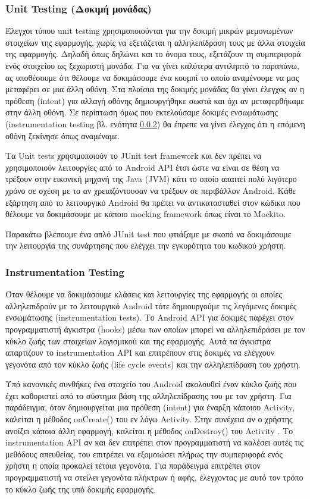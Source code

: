 		\subsubsection{Unit Testing (Δοκιμή μονάδας)}
		Έλεγχοι τύπου unit testing χρησιμοποιούνται για την δοκιμή μικρών μεμονωμένων στοιχείων της εφαρμογής, χωρίς να εξετάζεται η αλληλεπίδραση τους με άλλα στοιχεία της εφαρμογής. Δηλαδή όπως δηλώνει και το όνομα τους, εξετάζουν τη συμπεριφορά ενός στοιχείου ως ξεχωριστή μονάδα. Για να γίνει καλύτερα αντιληπτό το παραπάνω, ας υποθέσουμε ότι θέλουμε να δοκιμάσουμε ένα κουμπί το οποίο αναμένουμε να μας μεταφέρει σε μια άλλη οθόνη.  Στα πλαίσια της δοκιμής μονάδας θα γίνει έλεγχος αν η πρόθεση (intent) για αλλαγή οθόνης δημιουργήθηκε σωστά και όχι αν μεταφερθήκαμε στην άλλη οθόνη. Σε περίπτωση όμως που εκτελούσαμε δοκιμές ενσωμάτωσης (instrumentation testing βλ. ενότητα \ref{sssec:instrumentation_testing}) θα έπρεπε να γίνει έλεγχος ότι η επόμενη οθόνη ξεκίνησε όπως αναμέναμε.
		
		Τα Unit tests χρησιμοποιούν το JUnit test framework και δεν πρέπει να χρησιμοποιούν λειτουργίες από το Android API έτσι ώστε να είναι σε θέση να τρέξουν στην εικονική μηχανή της Java (JVM) κάτι το οποίο απαιτεί πολύ λιγότερο χρόνο σε σχέση με το αν χρειαζόντουσαν να τρέξουν σε περιβάλλον Android. Κάθε εξάρτηση από το λειτουργικό Android θα πρέπει να αντικατασταθεί στον κώδικα που θέλουμε να δοκιμάσουμε με κάποιο mocking framework όπως είναι το Mockito. 
		
		Παρακάτω βλέπουμε ένα απλό JUnit test που φτιάξαμε με σκοπό να δοκιμάσουμε την λειτουργία της συνάρτησης που ελέγχει την εγκυρότητα του κωδικού χρήστη.
		  
		\subsubsection{Instrumentation Testing}\label{sssec:instrumentation_testing}
		Όταν θέλουμε να δοκιμάσουμε κλάσεις και λειτουργίες της εφαρμογής οι οποίες αλληλεπιδρούν με το λειτουργικό Android τότε δημιουργούμε τις λεγόμενες δοκιμές ενσωμάτωσης (instrumentation tests). Το Android API για δοκιμές παρέχει στον προγραμματιστή άγκιστρα (hooks) μέσω των οποίων μπορεί να αλληλεπιδράσει με τον κύκλο ζωής των στοιχείων λογισμικού και της εφαρμογής. Αυτά τα άγκιστρα απαρτίζουν το instrumentation API και επιτρέπουν στις δοκιμές να ελέγχουν γεγονότα από τον κύκλο ζωής (life cycle events) και την αλληλεπίδραση του χρήστη.

		Υπό κανονικές συνθήκες ένα στοιχείο του Android ακολουθεί έναν κύκλο ζωής που έχει καθοριστεί από το σύστημα βάση της αλληλεπίδρασης του με τον χρήστη. Για παράδειγμα, όταν δημιουργείται μια πρόθεση (intent) για έναρξη κάποιου Activity, καλείται η μέθοδος onCreate() του εν λόγω Activity. Στην συνέχεια αν ο χρήστης ανοίξει κάποια άλλη εφαρμογή, καλείται η μέθοδος onDestroy() του Activity . Το instrumentation API αν και δεν επιτρέπει στον προγραμματιστή να καλέσει αυτές τις μεθόδους απευθείας, του επιτρέπει να εξομοιώσει πλήρως την συμπεριφορά ενός χρήστη η οποία προκαλεί τέτοια γεγονότα. Για παράδειγμα επιτρέπει στον προγραμματιστή να στείλει γεγονότα πλήκτρων ή αφής, έλεγχοντας με αυτό τον τρόπο το κύκλο ζωής της υπό δοκιμής εφαρμογής\cite{androidTestingBook}.

